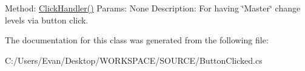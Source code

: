 Method\+: \mbox{\hyperlink{class_button_clicked_a8baf876afa682bea0f244c16a4e36d56}{Click\+Handler()}} Params\+: None Description\+: For having \char`\"{}\+Master\char`\"{} change levels via button click. 

The documentation for this class was generated from the following file\+:\begin{DoxyCompactItemize}
\item 
C\+:/\+Users/\+Evan/\+Desktop/\+W\+O\+R\+K\+S\+P\+A\+C\+E/\+S\+O\+U\+R\+C\+E/Button\+Clicked.\+cs\end{DoxyCompactItemize}
